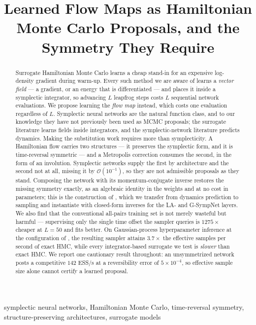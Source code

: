 \documentclass[mlabstract,onecolumn]{jmlr}
\title[Flow-Map Surrogates for HMC]{Learned Flow Maps as Hamiltonian Monte Carlo
Proposals, and the Symmetry They Require}
\begin{document}
\maketitle

\begin{abstract}
Surrogate Hamiltonian Monte Carlo learns a cheap stand-in for an expensive
log-density gradient during warm-up. Every such method we are aware of learns a
\emph{vector field} --- a gradient, or an energy that is differentiated --- and
places it inside a symplectic integrator, so advancing $L$ leapfrog steps costs
$L$ sequential network evaluations. We propose learning the \emph{flow map}
instead, which costs one evaluation regardless of $L$. Symplectic neural
networks are the natural function class, and to our knowledge they have not
previously been used as MCMC proposals; the surrogate literature learns fields
inside integrators, and the symplectic-network literature predicts dynamics.
Making the substitution work requires more than symplecticity. A Hamiltonian
flow carries two structures --- it preserves the symplectic form, and it is
time-reversal symmetric --- and a Metropolis correction consumes the second, in
the form of an involution. Symplectic networks supply the first by architecture
and the second not at all, missing it by $\mathcal{O}(10^{-1})$, so they are not
admissible proposals as they stand. Composing the network with its
momentum-conjugate inverse restores the missing symmetry exactly, as an
algebraic identity in the weights and at no cost in parameters; this is the
construction of \citet{valperga2022reversible}, which we transfer from dynamics
prediction to sampling and instantiate with closed-form inverses for the LA- and
G-SympNet layers. We also find that the conventional all-pairs training set is
not merely wasteful but harmful --- supervising only the single time offset the
sampler queries is $1275\times$ cheaper at $L=50$ and fits better. On
Gaussian-process hyperparameter inference at the configuration of
\citet{Li_2019}, the resulting sampler attains $3.7\times$ the effective samples
per second of exact HMC, while every integrator-based surrogate we test is
\emph{slower} than exact HMC. We report one cautionary result throughout: an
unsymmetrized network posts a competitive $142$ ESS/s at a reversibility error
of $5\times10^{-4}$, so effective sample size alone cannot certify a learned
proposal.
\end{abstract}

\begin{keywords}
symplectic neural networks, Hamiltonian Monte Carlo, time-reversal symmetry,
structure-preserving architectures, surrogate models
\end{keywords}
\end{document}
